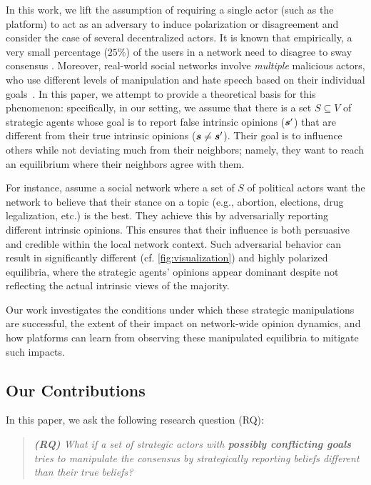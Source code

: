 In this work, we lift the assumption of requiring a single actor (such as the platform) to act as an adversary to induce polarization or disagreement and consider the case of several decentralized actors. It is known that empirically, a very small percentage ($25\%$) of the users in a network need to disagree to sway consensus \citep{centola2018experimental}. Moreover, real-world social networks involve {\em multiple } malicious actors, who use different levels of manipulation and hate speech based on their individual goals~\citep{wired2024profiteers}. In this paper, we attempt to provide a theoretical basis for this phenomenon: specifically, in our setting, we assume that there is a set $S \subseteq V$ of strategic agents whose goal is to report false intrinsic opinions ($\bm{s}'$) that are different from their true intrinsic opinions ($\bm{s} \neq \bm{s}'$). Their goal is to influence others while not deviating much from their neighbors; namely, they want to reach an equilibrium where their neighbors agree with them. 

For instance, assume a social network where a set of $S$ of political actors want the network to believe that their stance on a topic (e.g., abortion, elections, drug legalization, etc.) is the best. They achieve this by adversarially reporting different intrinsic opinions. This ensures that their influence is both persuasive and credible within the local network context. Such adversarial behavior can result in significantly different (cf. \cref{fig:visualization}) and highly polarized equilibria, where the strategic agents' opinions appear dominant despite not reflecting the actual intrinsic views of the majority. 

Our work investigates the conditions under which these strategic manipulations are successful, the extent of their impact on network-wide opinion dynamics, and how platforms can learn from observing these manipulated equilibria to mitigate such impacts.

\subsection{Our Contributions}

In this paper, we ask the following research question (RQ): 

\begin{quote}
    \textit{\textbf{(RQ)} What if a set of strategic actors with \textbf{possibly conflicting goals} tries to manipulate the consensus by strategically reporting beliefs different than their true beliefs?}
\end{quote}
 

